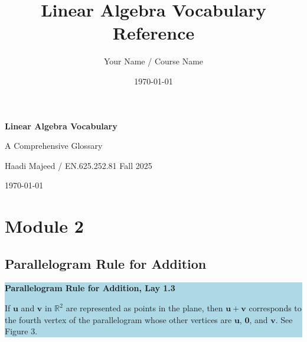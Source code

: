 \documentclass{article}
\title{Linear Algebra Vocabulary Reference}
\author{Your Name / Course Name}
\date{\today}
\begin{document}
\begin{titlepage}
    \centering
    \vspace*{2cm}
    {\Huge\bfseries Linear Algebra Vocabulary\par}
    \vspace{1cm}
    {\Large A Comprehensive Glossary\par}
    \vfill
    {\Large Haadi Majeed / EN.625.252.81 Fall 2025\par}
    \vfill
    {\large \today \par}
    \vspace{2cm}
\end{titlepage}

\newpage
\tableofcontents
\newpage %


\section{Module 2}
\subsection{Parallelogram Rule for Addition}

    \vspace{1cm}
    \begin{center}
    \colorbox{lightblue}{\parbox{0.9\textwidth}{
    \textbf{\color{cyan!80!black} Parallelogram Rule for Addition, Lay 1.3}

    If \(\mathbf{u}\) and \(\mathbf{v}\) in \(\mathbb{R}^2\) are represented as points in the plane, then \(\mathbf{u} + \mathbf{v}\) corresponds to the fourth vertex of the parallelogram whose other vertices are \(\mathbf{u}\), \(\mathbf{0}\), and \(\mathbf{v}\). See Figure 3.
    }}
    \end{center}

    \vspace{1cm}
\end{document}
